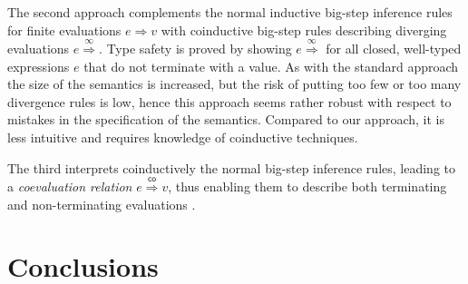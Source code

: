 \documentclass[12pt,a2paper,draft]{article}
\begin{document}
The second approach \cite{CousotCousot07,LeroyGrall09} complements the normal inductive big-step
inference rules for finite evaluations $e \Rightarrow v$ with coinductive big-step rules describing
diverging evaluations $e \stackrel{\infty}{\Rightarrow}$. Type safety is proved by showing
$e \stackrel{\infty}{\Rightarrow}$ for all closed, well-typed expressions $e$ that do not terminate
with a value. As with the standard approach the size of the semantics is increased, but the risk of
putting too few or too many divergence rules is low, hence this approach seems rather robust with
respect to mistakes in the specification of the semantics. Compared to our approach, it is less
intuitive and requires knowledge of coinductive techniques.

The third interprets coinductively the normal big-step inference rules, leading to a \emph{coevaluation
relation} $e \stackrel{\mathsf{co}}{\Rightarrow} v$, thus enabling them to describe both terminating
and non-terminating evaluations \cite{LeroyGrall09}.


\section{Conclusions}




\end{document}
